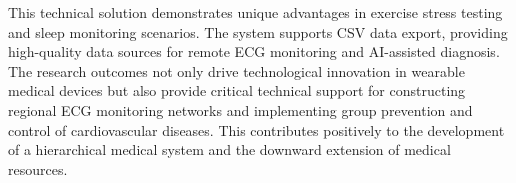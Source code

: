 \begin{abstracten}
    This technical solution demonstrates unique advantages in exercise stress testing and sleep monitoring scenarios. The system supports CSV data export, providing high-quality data sources for remote ECG monitoring and AI-assisted diagnosis. The research outcomes not only drive technological innovation in wearable medical devices but also provide critical technical support for constructing regional ECG monitoring networks and implementing group prevention and control of cardiovascular diseases. This contributes positively to the development of a hierarchical medical system and the downward extension of medical resources.
    
\end{abstracten}